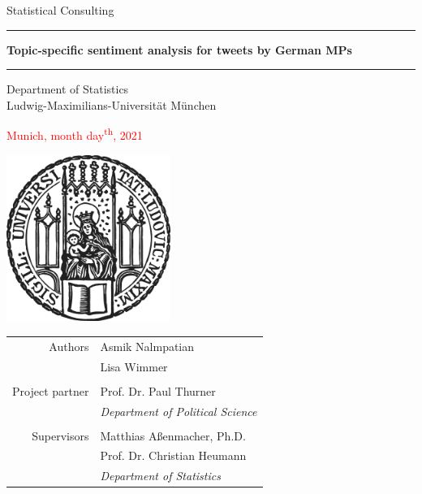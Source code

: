 \documentclass[12pt]{article}
\begin{document}


 
\begin{titlepage}
\begin{center}
    
\LARGE
Statistical Consulting
    
\vspace{0.5cm}
      
\rule{\textwidth}{1.5pt}
\Huge
\textbf{Topic-specific sentiment analysis for tweets by German MPs}
\rule{\textwidth}{1.5pt}
   
\vspace{0.5cm}
      
\large
Department of Statistics \\
Ludwig-Maximilians-Universität München 

\vfill

\textcolor{red}{Munich, month day\textsuperscript{th}, 2021}
      
\vfill

\includegraphics[width = 0.4\textwidth]{figures/sigillum.png}

\vfill

\begin{tabular}{rl}
  Authors & Asmik Nalmpatian \\
  & Lisa Wimmer \\
  & \\
  Project partner & Prof. Dr. Paul Thurner \\
  & \textit{Department of Political Science} \\
  & \\
  Supervisors & Matthias Aßenmacher, Ph.D. \\
  & Prof. Dr. Christian Heumann \\
  & \textit{Department of Statistics}
\end{tabular}

\end{center}
\end{titlepage}
\end{document}
